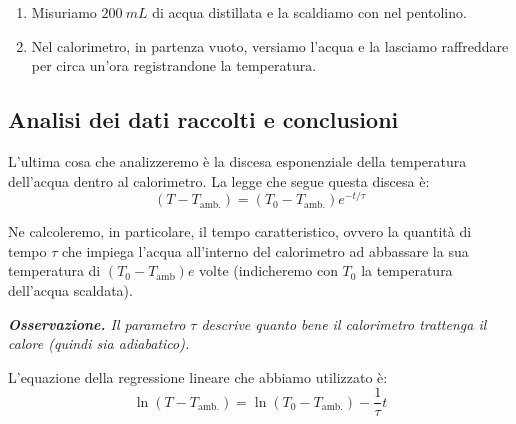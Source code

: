 \documentclass{article}
\begin{document}
\begin{enumerate}
    \item
        Misuriamo $\qty{200}{mL}$ di acqua distillata e la scaldiamo con nel
        pentolino.    %
    \item 
        Nel calorimetro, in partenza vuoto, versiamo l'acqua e la lasciamo
        raffreddare per circa un'ora registrandone la temperatura.
\end{enumerate}

\subsection{Analisi dei dati raccolti e conclusioni}
L'ultima cosa che analizzeremo è la discesa esponenziale della temperatura    %
dell'acqua dentro al calorimetro. La legge che segue questa discesa è:
    \[    
        (T-T_\text{amb.})=(T_0-T_\text{amb.}) e^{-t/\tau}
    \]

Ne calcoleremo, in particolare, il tempo caratteristico, ovvero la quantità
di tempo $\tau$ che impiega l'acqua all'interno del calorimetro ad abbassare
la sua temperatura di $(T_0 - T_\text{amb})e$ volte (indicheremo con $T_0$
la temperatura dell'acqua scaldata).

\emph{
        \textbf{Osservazione.} Il parametro $\tau$ descrive quanto bene il
        calorimetro trattenga il calore (quindi sia adiabatico). 
        }

L'equazione della regressione lineare che abbiamo utilizzato è:
\[\ln(T-T_\text{amb.})=\ln(T_0-T_\text{amb.})-\frac{1}{\tau}t\]
\end{document}
